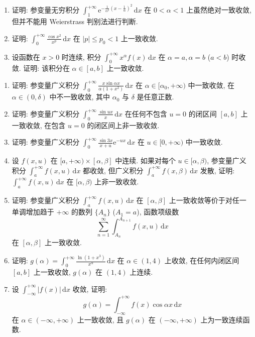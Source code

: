 \begin{exblock}[练习题 15.2]
\begin{enumerate}
  \item 证明: 参变量无穷积分 $\displaystyle\int_{1}^{+\infty}\mathrm{e}^{-\frac{1}{\alpha^{2}}\left(x-\frac{1}{\alpha}\right)^{2}}\,\mathrm{d}x$ 在 $0<\alpha<1$ 上虽然绝对一致收敛, 但并不能用 Weierstrass 判别法进行判断.
  \item 证明: $\displaystyle\int_{0}^{+\infty}\frac{\cos x^{2}}{x^{p}}\,\mathrm{d}x$ 在 $|p|\leqslant p_{0}<1$ 上一致收敛.
  \item 设函数在 $x>0$ 时连续, 积分 $\displaystyle\int_{0}^{+\infty}x^{\alpha}f(x)\,\mathrm{d}x$ 在 $\alpha=a,\alpha=b$ ($a<b$) 时收敛. 证明: 该积分在 $\alpha\in[a,b]$ 上一致收敛.
\end{enumerate}
\end{exblock}

\begin{exblock}[思考题 15.2]
\begin{enumerate}
  \item 证明: 参变量广义积分 $\displaystyle\int_{0}^{+\infty}\frac{x\sin\alpha x}{\alpha(1+x^{2})}\,\mathrm{d}x$ 在 $\alpha\in[\alpha_{0},+\infty)$ 中一致收敛, 在 $\alpha\in(0,\delta)$ 中不一致收敛, 其中 $\alpha_{0}$ 与 $\delta$ 是任意正数.
  \item 证明: 参变量广义积分 $\displaystyle\int_{0}^{+\infty}\frac{\sin ux}{x}\,\mathrm{d}x$ 在任何不包含 $u=0$ 的闭区间 $[a,b]$ 上一致收敛, 在包含 $u=0$ 的闭区间上非一致收敛.
  \item 证明: 参变量广义积分 $\displaystyle\int_{0}^{+\infty}\frac{\sin3x}{x+u}\mathrm{e}^{-ux}\,\mathrm{d}x$ 在 $u\in[0,+\infty)$ 中一致收敛.
  \item 设 $f(x,u)$ 在 $[a,+\infty)\times[\alpha,\beta]$ 中连续. 如果对每个 $u\in[\alpha,\beta)$, 参变量广义积分 $\displaystyle\int_{a}^{+\infty}f(x,u)\,\mathrm{d}x$ 都收敛, 但广义积分 $\displaystyle\int_{a}^{+\infty}f(x,\beta)\,\mathrm{d}x$ 发散, 证明: $\displaystyle\int_{a}^{+\infty}f(x,u)\,\mathrm{d}x$ 在 $[\alpha,\beta)$ 上非一致收敛.
  \item 证明: 参变量广义积分 $\displaystyle\int_{a}^{+\infty}f(x,u)\,\mathrm{d}x$ 在 $[\alpha,\beta]$ 上一致收敛等价于对任一单调增加趋于 $+\infty$ 的数列 $\{A_{n}\}$ ($A_{1}=a$), 函数项级数
  \[
    \sum_{n=1}^{\infty}\int_{A_{n}}^{A_{n+1}}f(x,u)\,\mathrm{d}x
\]
  在 $[\alpha,\beta]$ 上一致收敛.
  \item 证明: $g(\alpha)=\displaystyle\int_{0}^{+\infty}\frac{\ln(1+x^{3})}{x^{\alpha}}\,\mathrm{d}x$ 在 $\alpha\in(1,4)$ 上收敛, 在任何内闭区间 $[a,b]$ 上一致收敛, $g(\alpha)$ 在 $(1,4)$ 上连续.
  \item 设 $\displaystyle\int_{-\infty}^{+\infty}|f(x)|\,\mathrm{d}x$ 收敛, 证明:
  \[
    g(\alpha)=\int_{-\infty}^{+\infty}f(x)\cos\alpha x\,\mathrm{d}x
\]
  在 $\alpha\in(-\infty,+\infty)$ 上一致收敛, 且 $g(\alpha)$ 在 $(-\infty,+\infty)$ 上为一致连续函数.
\end{enumerate}
\end{exblock}
